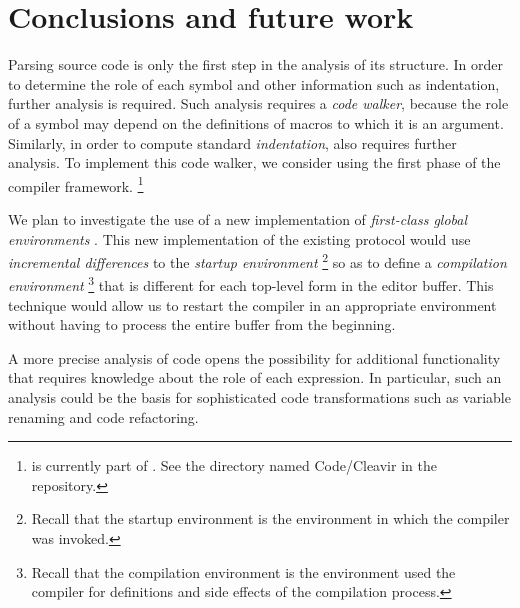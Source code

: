 \section{Conclusions and future work}

Parsing \commonlisp{} source code is only the first step in the
analysis of its structure.  In order to determine the role of each
symbol and other information such as indentation, further analysis is
required.  Such analysis requires a \emph{code walker}, because the
role of a symbol may depend on the definitions of macros to which it
is an argument.  Similarly, in order to compute standard
\emph{indentation}, also requires further analysis.  To implement this
code walker, we consider using the first phase of the \cleavir{}
compiler framework.%
\footnote{\cleavir{} is currently part of \sicl{}.  See the directory
  named Code/Cleavir in the \sicl{} repository.}

We plan to investigate the use of a new implementation of
\emph{first-class global environments}
\cite{Strandh:2015:ELS:Environments}.  This new implementation of the
existing \clos{} protocol would use \emph{incremental differences} to
the \emph{startup environment}%
\footnote{Recall that the startup environment is the environment in
  which the compiler was invoked.}
so as to define a \emph{compilation environment}%
\footnote{Recall that the compilation environment is the environment
  used the compiler for definitions and side effects of the
  compilation process.}
that is different for each top-level form in the editor buffer.  This
technique would allow us to restart the compiler in an appropriate
environment without having to process the entire buffer from the
beginning.

A more precise analysis of \commonlisp{} code opens the
possibility for additional functionality that requires knowledge about
the role of each expression.  In particular, such an analysis could be
the basis for sophisticated code transformations such as variable
renaming and code refactoring.
